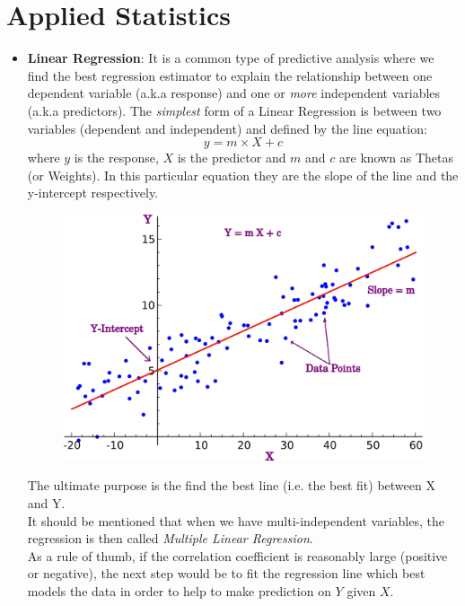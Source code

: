 \documentclass[11pt, twocolumn]{article}
\begin{document}
\section{Applied Statistics}
\begin{itemize}
\item \textbf{Linear Regression}: It is a common type of {\color{blue}predictive analysis} where we find the best {\color{blue}regression estimator} to explain the relationship between one {\color{blue}dependen}t variable (a.k.a response) and one or \textit{more} {\color{blue}independent} variables (a.k.a predictors).
The \textit{simplest} form of a Linear Regression is between two variables (dependent and independent) and defined by the line equation: 
$$y = m \times X + c$$
where $y$ is the response, $X$ is the predictor and $m$ and $c$ are known as Thetas (or Weights). In this particular equation they are the slope of the line and the y-intercept respectively.

\begin{figure}[h!]
  \centering
  \includegraphics[width=0.8\linewidth]{figs/linear_regression.jpeg}
\end{figure}

The ultimate purpose is the find the best line (i.e. the best fit) between X and Y.\\
It should be mentioned that when we have multi-independent variables, the regression is then called \textit{Multiple Linear Regression}.\\
As a rule of thumb, if the correlation coefficient is reasonably large (positive or negative), the next step would be to fit the regression line which best models the data in order to help to make prediction on $Y$ given $X$.
\end{itemize}
\end{document}
